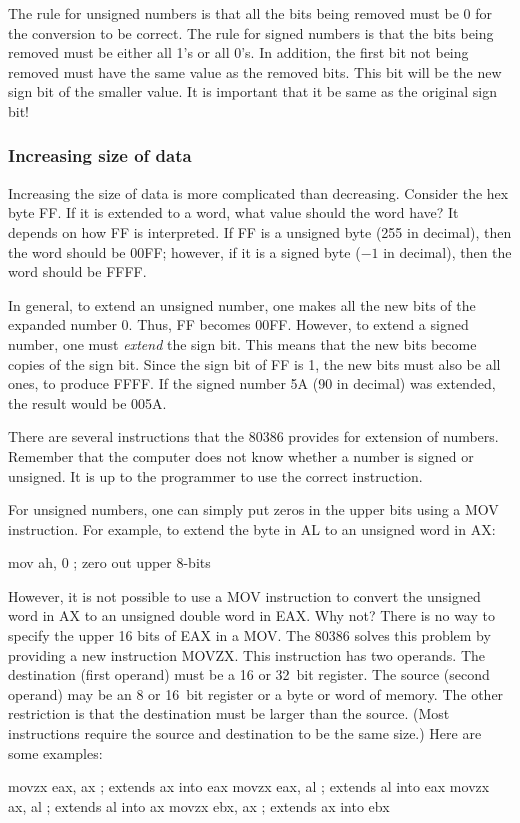 The rule for unsigned numbers is that all the bits being removed must
be 0 for the conversion to be correct. The rule for signed numbers is
that the bits being removed must be either all 1's or all 0's. In
addition, the first bit not being removed must have the same value as
the removed bits. This bit will be the new sign bit of the smaller value.
It is important that it be same as the original sign bit!

\subsubsection{Increasing size of data}

Increasing the size of data is more complicated than
decreasing. Consider the hex byte FF. If it is extended to a word,
what value should the word have?  It depends on how FF is
interpreted. If FF is a unsigned byte (255 in decimal), then the word
should be 00FF; however, if it is a signed byte ($-1$ in decimal),
then the word should be FFFF.

In general, to extend an unsigned number, one makes all the new bits
of the expanded number 0. Thus, FF becomes 00FF. However, to extend a
signed number, one must \emph{extend} the sign
bit.  This means that the new bits become
copies of the sign bit. Since the sign bit of FF is 1, the new bits
must also be all ones, to produce FFFF. If the signed number 5A (90 in
decimal) was extended, the result would be 005A.

There are several instructions that the 80386 provides for extension of
numbers. Remember that the computer does not know whether a number is signed
or unsigned. It is up to the programmer to use the correct instruction.

For unsigned numbers, one can simply put zeros in the upper bits using a
{\code MOV} instruction. For example, to extend the byte in AL to an unsigned
word in AX:
\begin{AsmCodeListing}[numbers=none,frame=none]
      mov    ah, 0   ; zero out upper 8-bits
\end{AsmCodeListing}
However, it is not possible to use a {\code MOV} instruction to
convert the unsigned word in AX to an unsigned double word in EAX. Why
not? There is no way to specify the upper 16 bits of EAX in a {\code
MOV}. The 80386 solves this problem by providing a new instruction
{\code MOVZX}.  This instruction has two operands. The destination
(first operand) must be a 16 or 32~bit register.  The source (second
operand) may be an 8 or 16~bit register or a byte or word of
memory. The other restriction is that the destination must be larger than
the source. (Most instructions require the source and destination to be
the same size.) Here are some examples:
\begin{AsmCodeListing}[numbers=none,frame=none]
      movzx  eax, ax      ; extends ax into eax
      movzx  eax, al      ; extends al into eax
      movzx  ax, al       ; extends al into ax
      movzx  ebx, ax      ; extends ax into ebx
\end{AsmCodeListing}

